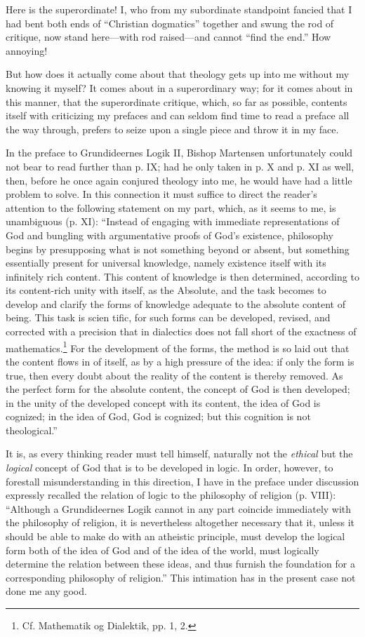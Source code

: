 \documentclass[12pt]{book}
\newcommand{\opage}[1]{\marginnote{\footnotesize\textit{[#1]}}}
\begin{document}
Here is the superordinate! I, who from my subordinate standpoint fancied that I had bent both ends of ``Christian dogmatics'' together and swung the rod of critique, now stand here---with rod raised---and cannot ``find the end.'' How annoying!

But how does it actually come about that theology gets up into me without my knowing it myself? It comes about in a superordinary way; for it comes about in this manner, that the superordinate critique, which, so far as possible, contents itself with criticizing my prefaces and can seldom find time to read a preface all the way through, prefers to seize upon a single piece and throw it in my face.

In the preface to Grundideernes Logik II, Bishop Martensen unfortunately could not bear to read further than p. IX; had he only taken in p. X and p. XI as well, then, before he once again conjured theology into me, he would have had a little problem to solve. In this connection it must suffice to direct the reader's attention to the following statement on my part, which, as it seems to me, is unambiguous (p. XI): ``Instead of engaging with immediate representations of God and bungling with argumentative proofs of God's existence, philosophy begins by presupposing what is not something beyond or absent, but something essentially present for universal knowledge, namely existence itself with its infinitely rich content. This content of knowledge is then determined, according to its content-rich unity with itself, as the Absolute, and the task becomes to develop and clarify the forms of knowledge adequate to the absolute content of being. This task is scien%
\opage{116}\setcounter{footnote}{0}%
tific, for such forms can be developed, revised, and corrected with a precision that in dialectics does not fall short of the exactness of mathematics.\footnote{Cf. Mathematik og Dialektik, pp. 1, 2.}
For the development of the forms, the method is so laid out that the content flows in of itself, as by a high pressure of the idea: if only the form is true, then every doubt about the reality of the content is thereby removed. As the perfect form for the absolute content, the concept of God is then developed; in the unity of the developed concept with its content, the idea of God is cognized; in the idea of God, God is cognized; but this cognition is not theological.''

It is, as every thinking reader must tell himself, naturally not the \emph{ethical} but the \emph{logical} concept of God that is to be developed in logic. In order, however, to forestall misunderstanding in this direction, I have in the preface under discussion expressly recalled the relation of logic to the philosophy of religion (p. VIII): ``Although a Grundideernes Logik cannot in any part coincide immediately with the philosophy of religion, it is nevertheless altogether necessary that it, unless it should be able to make do with an atheistic principle, must develop the logical form both of the idea of God and of the idea of the world, must logically determine the relation between these ideas, and thus furnish the foundation for a corresponding philosophy of religion.'' This intimation has in the present case not done me any good.
\end{document}
